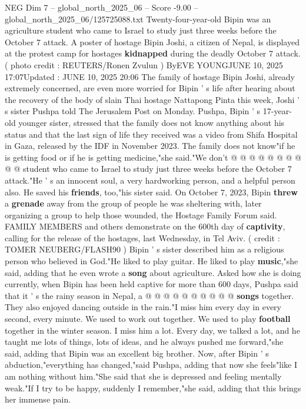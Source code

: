 \begin{textsample}{NEG Dim 7 – global\_north\_2025\_06 – Score -9.00 – global\_north\_2025\_06/125725088.txt}  \label{ex:f7_neg_072}
Twenty-four-year-old Bipin was an agriculture student who came to Israel to study just three weeks before the October 7 attack.
A poster of hostage Bipin Joshi, a citizen of Nepal, is displayed at the protest camp for hostages \textbf{kidnapped} during the deadly October 7 attack. ( photo credit : REUTERS/Ronen Zvulun ) ByEVE YOUNGJUNE 10, 2025 17:07Updated : JUNE 10, 2025 20:06 The family of hostage Bipin Joshi, already extremely concerned, are even more worried for Bipin ' s life after hearing about the recovery of the body of slain Thai hostage Nattapong Pinta this week, Joshi ' s sister Pushpa told The Jerusalem Post on Monday.
Pushpa, Bipin ' s 17-year-old younger sister, stressed that the family does not know anything about his status and that the last sign of life they received was a video from Shifa Hospital in Gaza, released by the IDF in November 2023.
The family does not know"if he is getting food or if he is getting medicine,"she said."We don't @ @ @ @ @ @ @ @ @ @ student who came to Israel to study just three weeks before the October 7 attack."He ' s an innocent soul, a very hardworking person, and a helpful person also.
He saved his \textbf{friends}, too,"his sister said.
On October 7, 2023, Bipin \textbf{threw} a \textbf{grenade} away from the group of people he was sheltering with, later organizing a group to help those wounded, the Hostage Family Forum said.
FAMILY MEMBERS and others demonstrate on the 600th day of \textbf{captivity}, calling for the release of the hostages, last Wednesday, in Tel Aviv. ( credit : TOMER NEUBERG/FLASH90 ) Bipin ' s sister described him as a religious person who believed in God."He liked to play guitar.
He liked to play \textbf{music},"she said, adding that he even wrote a \textbf{song} about agriculture.
Asked how she is doing currently, when Bipin has been held captive for more than 600 days, Pushpa said that it ' s the rainy season in Nepal, a @ @ @ @ @ @ @ @ @ @ \textbf{songs} together.
They also enjoyed dancing outside in the rain."I miss him every day in every second, every minute.
We used to work out together.
We used to play \textbf{football} together in the winter season.
I miss him a lot.
Every day, we talked a lot, and he taught me lots of things, lots of ideas, and he always pushed me forward,"she said, adding that Bipin was an excellent big brother.
Now, after Bipin ' s abduction,"everything has changed,"said Pushpa, adding that now she feels"like I am nothing without him."She said that she is depressed and feeling mentally weak."If I try to be happy, suddenly I remember,"she said, adding that this brings her immense pain.

\end{textsample}
